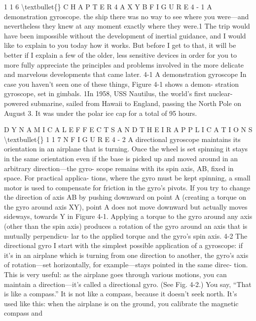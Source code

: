 \documentclass[10pt,oneside]{article}
\begin{document}
1 1 6 \textbackslash{}textbullet\{\} C H A P T E R  4 A X Y B F I G U R E  4 - 1 A demonstration gyroscope. the ship there was no way to see where you were---and nevertheless they knew at any moment exactly where they were.1 The trip would have been impossible without the development of inertial guidance, and I would like to explain to you today how it works. But before I get to that, it will be better if I explain a few of the older, less sensitive devices in order for you to more fully appreciate the principles and problems involved in the more delicate and marvelous developments that came later. 4-1 A demonstration gyroscope In case you haven’t seen one of these things, Figure 4-1 shows a demon- stration gyroscope, set in gimbals. 1In 1958, USS Nautilus, the world’s first nuclear-powered submarine, sailed from Hawaii to England, passing the North Pole on August 3. It was under the polar ice cap for a total of 95 hours.\par

D Y N A M I C A L  E F F E C T S  A N D  T H E I R  A P P L I C A T I O N S \textbackslash{}textbullet\{\} 1 1 7 N F I G U R E  4 - 2 A directional gyroscope maintains its orientation in an airplane that is turning. Once the wheel is set spinning it stays in the same orientation even if the base is picked up and moved around in an arbitrary direction---the gyro- scope remains with its spin axis, AB, fixed in space. For practical applica- tions, where the gyro must be kept spinning, a small motor is used to compensate for friction in the gyro’s pivots. If you try to change the direction of axis AB by pushing downward on point A (creating a torque on the gyro around axis XY), point A does not move downward but actually moves sideways, towards Y in Figure 4-1. Applying a torque to the gyro around any axis (other than the spin axis) produces a rotation of the gyro around an axis that is mutually perpendicu- lar to the applied torque and the gyro’s spin axis. 4-2 The directional gyro I start with the simplest possible application of a gyroscope: if it’s in an airplane which is turning from one direction to another, the gyro’s axis of rotation---set horizontally, for example---stays pointed in the same direc- tion. This is very useful: as the airplane goes through various motions, you can maintain a direction---it’s called a directional gyro. (See Fig. 4-2.) You say, “That is like a compass.” It is not like a compass, because it doesn’t seek north. It’s used like this: when the airplane is on the ground, you calibrate the magnetic compass and\par
\end{document}
